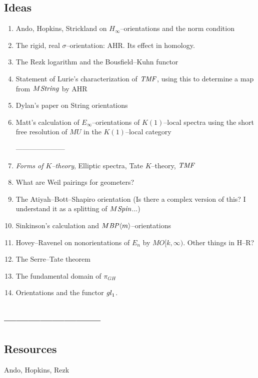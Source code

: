 \documentclass[12pt]{book}
\begin{document}
\newpage

\subsection*{Ideas}
\begin{enumerate}
\item Ando, Hopkins, Strickland on $H_\infty$--orientations and the norm condition
\item The rigid, real $\sigma$--orientation: AHR. Its effect in homology.
\item The Rezk logarithm and the Bousfield--Kuhn functor
\item Statement of Lurie's characterization of $\mathit{TMF}$, using this to determine a map from $M\mathit{String}$ by AHR
\item Dylan's paper on String orientations
\item Matt's calculation of $E_\infty$--orientations of $K(1)$--local spectra using the short free resolution of $MU$ in the $K(1)$--local category

---------------------
\item \textit{Forms of $K$--theory}, Elliptic spectra, Tate $K$--theory, $\mathit{TMF}$
\item What are Weil pairings for geometers?
\item The Atiyah--Bott--Shapiro orientation (Is there a complex version of this? I understand it as a splitting of $M\mathit{Spin}$...)
\item Sinkinson's calculation and $M\mathit{BP}\langle m\rangle$--orientations
\item Hovey--Ravenel on nonorientations of $E_n$ by $MO[k, \infty)$. Other things in H--R?
\item The Serre--Tate theorem
\item The fundamental domain of $\pi_{GH}$
\item Orientations and the functor $\mathit{gl}_1$.
\end{enumerate}

\subsection*{------------------------}



\subsection*{Resources}

Ando, Hopkins, Rezk
\end{document}
